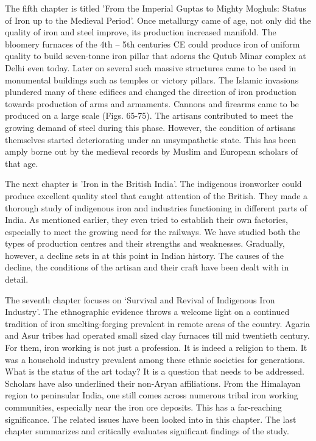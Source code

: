 The fifth chapter is titled 'From the Imperial Guptas to Mighty Moghuls: Status of Iron up to the Medieval Period'. Once metallurgy came of age, not only did the quality of iron and steel improve, its production increased manifold. The bloomery furnaces of the 4th – 5th centuries CE could produce iron of uniform quality to build seven-tonne iron pillar that adorns the Qutub Minar complex at Delhi even today. Later on several such massive structures came to be used in monumental buildings such as temples or victory pillars. The Islamic invasions plundered many of these edifices and changed the direction of iron production towards production of arms and armaments. Cannons and firearms came to be produced on a large scale (Figs. 65-75). The artisans contributed to meet the growing demand of steel during this phase. However, the condition of artisans themselves started deteriorating under an unsympathetic state. This has been amply borne out by the medieval records by Muslim and European scholars of that age.

The next chapter is 'Iron in the British India'. The indigenous ironworker could produce excellent quality steel that caught attention of the British. They made a thorough study of indigenous iron and industries functioning in different parts of India. As mentioned earlier, they even tried to establish their own factories, especially to meet the growing need for the railways. We have studied both the types of production centres and their strengths and weaknesses. Gradually, however, a decline sets in at this point in Indian history. The causes of the decline, the conditions of the artisan and their craft have been dealt with in detail.

The seventh chapter focuses on `Survival and Revival of Indigenous Iron Industry'. The ethnographic evidence throws a welcome light on a continued tradition of iron smelting-forging prevalent in remote areas of the country. Agaria and Asur tribes had operated small sized clay furnaces till mid twentieth century. For them, iron working is not just a profession. It is indeed a religion to them. It was a household industry prevalent among these ethnic societies for generations. What is the status of the art today? It is a question that needs to be addressed. Scholars have also underlined their non-Aryan affiliations. From the Himalayan region to peninsular India, one still comes across numerous tribal iron working communities, especially near the iron ore deposits. This has a far-reaching significance. The related issues have been looked into in this chapter. The last chapter summarizes and critically evaluates significant findings of the study.

